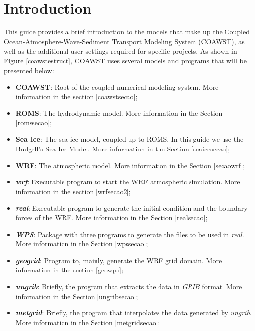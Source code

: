 \chapter{Introduction}
\bigskip

 This guide provides a brief introduction to the models that make up the Coupled Ocean-Atmosphere-Wave-Sediment Transport Modeling System
(COAWST), as well as the additional user settings required for specific projects. As shown in Figure \textcolor{bleu_cite} {\ref{coawstestruct}},
COAWST uses several models and programs that will be presented below:


\bigskip

\begin{itemize}
    \item \textbf{COAWST}: Root of the coupled numerical modeling system. More information in the section \textcolor{bleu_cite}{\ref{coawstsecao}};
    \item \textbf{ROMS}: The hydrodynamic model. More information in the Section \textcolor {bleu_cite}{\ref{romssecao}};
    \item \textbf{Sea Ice}: The sea ice model, coupled up to ROMS. In this guide we use the Budgell's Sea Ice Model. More information in the Section \textcolor{bleu_cite}{\ref{seaicesecao}};
    \item \textbf{WRF}: The atmospheric model. More information in the Section \textcolor{bleu_cite}{\ref{secaowrf}};
    \item \textit{\textbf{wrf}}: Executable program to start the WRF atmospheric simulation. More information in the section \textcolor{bleu_cite}{\ref{wrfsecao2}};
    \item \textit{\textbf{real}}: Executable program to generate the initial condition and the boundary forces of the WRF. More information in the Section \textcolor{bleu_cite}{\ref{realsecao}};
    \item \textit{\textbf{WPS}}: Package with three programs to generate the files to be used in \textit {real}. More information in the Section \textcolor{bleu_cite}{\ref{wpssecao}};
    \item \textit{\textbf{geogrid}}: Program to, mainly, generate the WRF grid domain. More information in the section \textcolor{bleu_cite}{\ref{geowps}};
    \item \textit{\textbf{ungrib}}: Briefly, the program that extracts the data in \textit{GRIB} format. More information in the Section \textcolor{bleu_cite}{\ref{ungribsecao}};   
    \item \textit{\textbf{metgrid}}: Briefly, the program that interpolates the data generated by \textit {ungrib}. More information in the Section \textcolor{bleu_cite}{\ref {metgridsecao}};    

\end{itemize}
